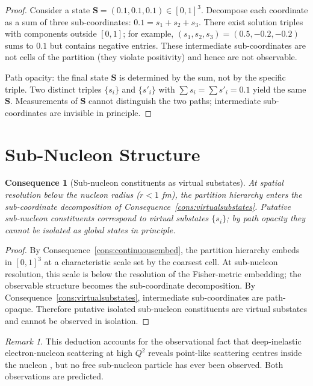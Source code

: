 \documentclass[11pt,twocolumn,a4paper]{article}
\theoremstyle{axiomstyle}
\theoremstyle{conseqstyle}
\newtheorem{consequence}{Consequence}
\theoremstyle{definition}
\theoremstyle{remark}
\newtheorem*{remark}{Remark}
\begin{document}
\begin{proof}
Consider a state $\mathbf{S}=(0.1,0.1,0.1)\in[0,1]^{3}$. Decompose each coordinate as a sum of three sub-coordinates: $0.1=s_{1}+s_{2}+s_{3}$. There exist solution triples with components outside $[0,1]$; for example, $(s_{1},s_{2},s_{3})=(0.5,-0.2,-0.2)$ sums to $0.1$ but contains negative entries. These intermediate sub-coordinates are not cells of the partition (they violate positivity) and hence are not observable.

Path opacity: the final state $\mathbf{S}$ is determined by the sum, not by the specific triple. Two distinct triples $\{s_{i}\}$ and $\{s'_{i}\}$ with $\sum s_{i}=\sum s'_{i}=0.1$ yield the same $\mathbf{S}$. Measurements of $\mathbf{S}$ cannot distinguish the two paths; intermediate sub-coordinates are invisible in principle.
\end{proof}

\section{Sub-Nucleon Structure}
\label{sec:subnucleonstructure}

\begin{consequence}[Sub-nucleon constituents as virtual substates]
\label{cons:subnucleon}
At spatial resolution below the nucleon radius ($r<1$ fm), the partition hierarchy enters the sub-coordinate decomposition of Consequence~\ref{cons:virtualsubstates}. Putative sub-nucleon constituents correspond to virtual substates $\{s_{i}\}$; by path opacity they cannot be isolated as global states in principle.
\end{consequence}

\begin{proof}
By Consequence~\ref{cons:continuousembed}, the partition hierarchy embeds in $[0,1]^{3}$ at a characteristic scale set by the coarsest cell. At sub-nucleon resolution, this scale is below the resolution of the Fisher-metric embedding; the observable structure becomes the sub-coordinate decomposition. By Consequence~\ref{cons:virtualsubstates}, intermediate sub-coordinates are path-opaque. Therefore putative isolated sub-nucleon constituents are virtual substates and cannot be observed in isolation.
\end{proof}

\begin{remark}
This deduction accounts for the observational fact that deep-inelastic electron-nucleon scattering at high $Q^{2}$ reveals point-like scattering centres inside the nucleon \citep{friedman1972}, but no free sub-nucleon particle has ever been observed. Both observations are predicted.
\end{remark}
\end{document}
